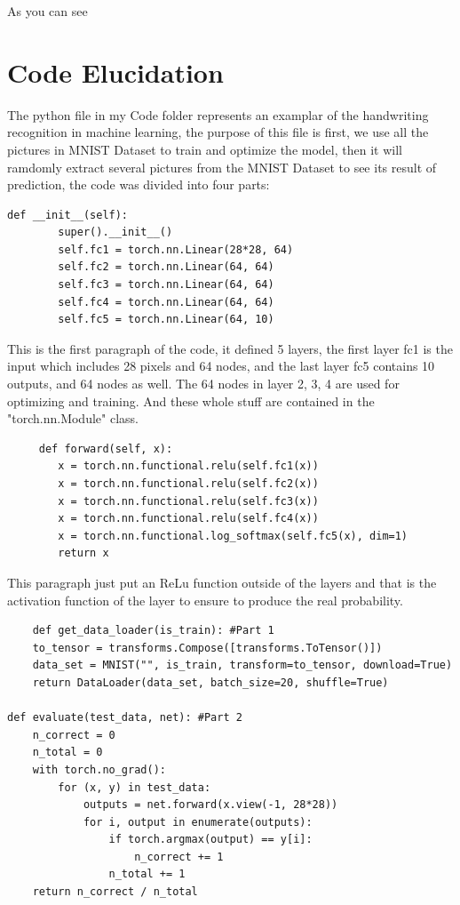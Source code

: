 \documentclass[12pt]{article}
\begin{document}
As you can see

\section*{Code Elucidation}
The python file in my Code folder represents an examplar of the handwriting recognition in machine learning, the purpose of this file is first, we use all the pictures in MNIST Dataset to train and optimize the model, then it will ramdomly extract several pictures from the MNIST Dataset to see its result of prediction, the code was divided into four parts:
\begin{verbatim}
def __init__(self):
        super().__init__()
        self.fc1 = torch.nn.Linear(28*28, 64)
        self.fc2 = torch.nn.Linear(64, 64)
        self.fc3 = torch.nn.Linear(64, 64)
        self.fc4 = torch.nn.Linear(64, 64)
        self.fc5 = torch.nn.Linear(64, 10)
\end{verbatim}

This is the first paragraph of the code, it defined 5 layers, the first layer fc1 is the input which includes 28 pixels and 64 nodes, and the last layer fc5 contains 10 outputs, and 64 nodes as well. The 64 nodes in layer 2, 3, 4 are used for optimizing and training. And these whole stuff are contained in the "torch.nn.Module" class. 

\begin{verbatim}
     def forward(self, x):
        x = torch.nn.functional.relu(self.fc1(x))
        x = torch.nn.functional.relu(self.fc2(x))
        x = torch.nn.functional.relu(self.fc3(x))
        x = torch.nn.functional.relu(self.fc4(x))
        x = torch.nn.functional.log_softmax(self.fc5(x), dim=1)
        return x
\end{verbatim}

This paragraph just put an ReLu function outside of the layers and that is the activation function of the layer to ensure to produce the real probability. 

\begin{verbatim}
    def get_data_loader(is_train): #Part 1
    to_tensor = transforms.Compose([transforms.ToTensor()])
    data_set = MNIST("", is_train, transform=to_tensor, download=True)
    return DataLoader(data_set, batch_size=20, shuffle=True)
    
def evaluate(test_data, net): #Part 2
    n_correct = 0
    n_total = 0
    with torch.no_grad():
        for (x, y) in test_data:
            outputs = net.forward(x.view(-1, 28*28))
            for i, output in enumerate(outputs):
                if torch.argmax(output) == y[i]:
                    n_correct += 1
                n_total += 1
    return n_correct / n_total
\end{verbatim}
\end{document}
